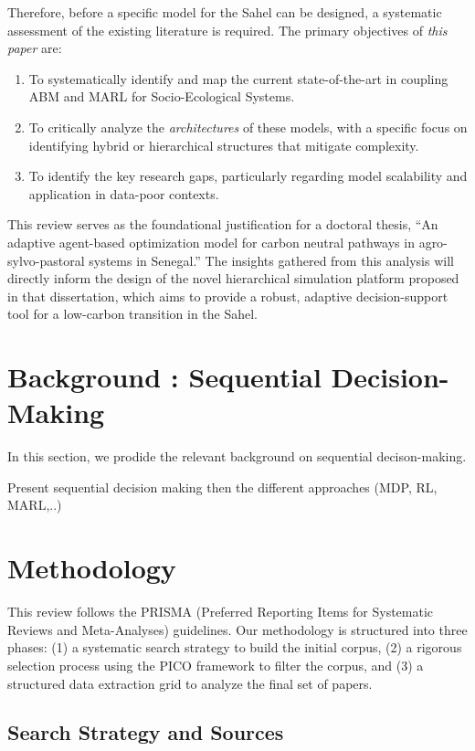 \documentclass[conference]{IEEEtran}
\begin{document}
Therefore, before a specific model for the Sahel can be designed, a systematic assessment of the existing literature is required. The primary objectives of \textit{this paper} are:
\begin{enumerate}
    \item To systematically identify and map the current state-of-the-art in coupling ABM and MARL for Socio-Ecological Systems.
    \item To critically analyze the \textit{architectures} of these models, with a specific focus on identifying hybrid or hierarchical structures that mitigate complexity.
    \item To identify the key research gaps, particularly regarding model scalability and application in data-poor contexts.
\end{enumerate}

This review serves as the foundational justification for a doctoral thesis, ``An adaptive agent-based optimization model for carbon neutral pathways in agro-sylvo-pastoral systems in Senegal.'' The insights gathered from this analysis will directly inform the design of the novel hierarchical simulation platform proposed in that dissertation, which aims to provide a robust, adaptive decision-support tool for a low-carbon transition in the Sahel.

\section{Background : Sequential Decision-Making}

In this section, we prodide the relevant background on sequential decison-making.

Present sequential decision making then the different approaches (MDP, RL, MARL,..)

\section{Methodology}

This review follows the PRISMA (Preferred Reporting Items for Systematic Reviews and Meta-Analyses) guidelines. Our methodology is structured into three phases: (1) a systematic search strategy to build the initial corpus, (2) a rigorous selection process using the PICO framework to filter the corpus, and (3) a structured data extraction grid to analyze the final set of papers.

\subsection{Search Strategy and Sources}
\end{document}
